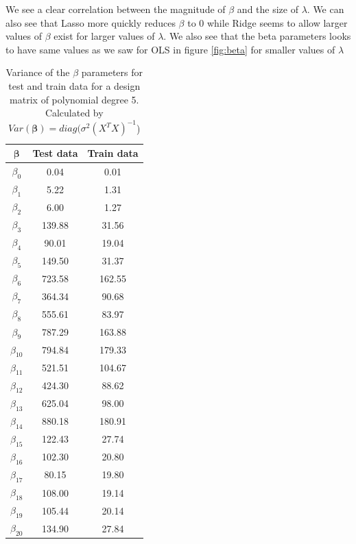 \documentclass[12pt]{article}
\begin{document}
We see a clear correlation between the magnitude of $\beta$ and the size of $\lambda$. We can also see that Lasso more quickly reduces $\beta$ to 0 while Ridge seems to allow larger values of $\beta$ exist for larger values of $\lambda$. We also see that the beta parameters looks to have same values as we saw for OLS in figure \ref{fig:beta} for smaller values of $\lambda$

\begin{table}[H]
  \caption{Variance of the $\beta$ parameters for test and train data for a design matrix of polynomial degree 5. Calculated by $Var(\boldsymbol{\beta}) = diag(\sigma^2(X^T X)^{-1}$)}
  \label{tab:beta}
  \centering
  \begin{tabular}{|c|c|c|}
    \hline
    $\boldsymbol{\beta}$ &\textbf{Test data} & \textbf{Train data} \\\hline
    $\beta_{0}$ & 0.04 & 0.01 \\
    $\beta_{1}$ & 5.22 & 1.31 \\
    $\beta_{2}$ & 6.00 & 1.27 \\
    $\beta_{3}$ & 139.88 & 31.56 \\
    $\beta_{4}$ & 90.01 & 19.04 \\
    $\beta_{5}$ & 149.50 & 31.37 \\
    $\beta_{6}$ & 723.58 & 162.55 \\
    $\beta_{7}$ & 364.34 & 90.68 \\
    $\beta_{8}$ & 555.61 & 83.97 \\
    $\beta_{9}$ & 787.29 & 163.88 \\
    $\beta_{10}$ & 794.84 & 179.33 \\
    $\beta_{11}$ & 521.51 & 104.67 \\
    $\beta_{12}$ & 424.30 & 88.62 \\
    $\beta_{13}$ & 625.04 & 98.00 \\
    $\beta_{14}$ & 880.18 & 180.91 \\
    $\beta_{15}$ & 122.43 & 27.74 \\
    $\beta_{16}$ & 102.30 & 20.80 \\
    $\beta_{17}$ & 80.15 & 19.80 \\
    $\beta_{18}$ & 108.00 & 19.14 \\
    $\beta_{19}$ & 105.44 & 20.14 \\
    $\beta_{20}$ & 134.90 & 27.84 \\
    \hline
  \end{tabular}
\end{table}
\end{document}
